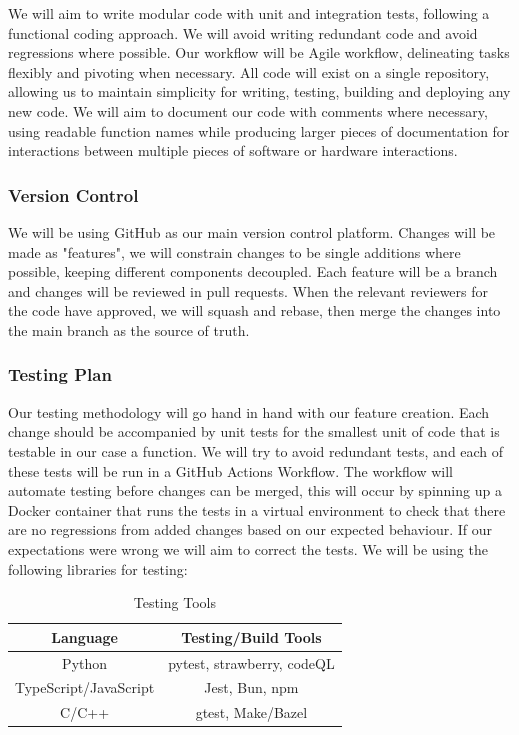 \documentclass[a4]{article}
\begin{document}
We will aim to write modular code with unit and integration tests,
following a functional coding approach.
We will avoid writing redundant code and avoid regressions where possible.
Our workflow will be Agile workflow, delineating tasks flexibly and pivoting when necessary.
All code will exist on a single repository, allowing us to maintain simplicity for writing, testing, building
and deploying any new code. We will aim to document our code with comments where necessary,
using readable function names while producing larger pieces of documentation for interactions between
multiple pieces of software or hardware interactions.

\subsubsection{Version Control}

We will be using GitHub as our main version control platform. Changes will be made as "features", we will constrain changes to be single additions where possible, keeping different components decoupled.
Each feature will be a branch and changes will be reviewed in pull requests. When the relevant reviewers for the code have approved,
we will squash and rebase, then merge the changes into the main branch as the source of truth.



\subsubsection{Testing Plan}

Our testing methodology will go hand in hand with our feature creation. Each change should be accompanied by unit tests for the smallest unit of code that is testable in our case a function.
We will try to avoid redundant tests, and each of these tests will be run in a GitHub Actions Workflow. The workflow will automate testing before changes can be merged, this will occur by spinning up
a Docker container that runs the tests in a virtual environment to check that there are no regressions from added changes based on our expected behaviour. If our expectations were wrong we will aim to correct the tests. We will be using the following libraries for testing:

\begin{table}[h!]
	\centering
	\begin{tabular}{|c|c|}
		\hline
		\textcolor{McMasterMaroon}{\textbf{Language}} &
		\textcolor{McMasterMaroon}{\textbf{Testing/Build Tools}}                   \\
		\hline
		Python                                        & pytest, strawberry, codeQL \\
		\hline
		TypeScript/JavaScript                         & Jest, Bun, npm             \\
		\hline
		C/C++                                         & gtest, Make/Bazel          \\
		\hline
	\end{tabular}
	\caption{Testing Tools}
\end{table}
\end{document}
